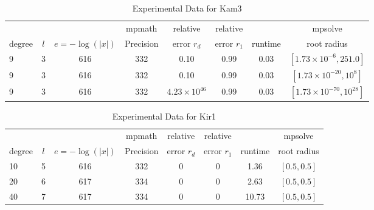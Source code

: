 \documentclass[sigconf]{acmart}
\begin{document}
\begin{table}[t]
\caption{Experimental Data for Kam3}
\label{tab:kam3}
\vskip -0.15in
\begin{center}
\begin{small}
\begin{sc}
\begin{tabular}{lccccccc}
\toprule
&  &  & mpmath & relative  & relative &  & mpsolve \\
degree  & $l$& $e=-\log(|x|)$& Precision &error $r_d$       & error $r_1$ &runtime& root radius\\
\midrule
   9 & 3 & 616 & 332 & 0.10 & 0.99 & 0.03 & $[1.73 \times 10^{-6},251.0]$ \\
   9 & 3 & 616 & 332 & 0.10 & 0.99 & 0.03 & $[1.73 \times 10^{-20},10^8]$\\ %
   9 & 3 & 616 & 332 & $4.23 \times 10^{46}$ & 0.99 & 0.03 & $[1.73 \times 10^{-70},10^{28}]$\\
\bottomrule
\end{tabular}
\end{sc}
\end{small}
\end{center}
\vskip 0.05in
\end{table}

\begin{table}[t]
\caption{Experimental Data for Kir1}
\label{tab:kir1}
\vskip -0.15in
\begin{center}
\begin{small}
\begin{sc}
\begin{tabular}{lccccccc}
\toprule
&  &  & mpmath & relative  & relative &  & mpsolve \\
degree  & $l$& $e=-\log(|x|)$& Precision &error $r_d$       & error $r_1$ &runtime& root radius\\
\midrule
   10 & 5 & 616 & 332 & 0 & 0 & 1.36 & $[0.5, 0.5]$\\
   20 & 6 & 617 & 334 & 0 & 0 & 2.63 & $[0.5, 0.5]$\\
   40 & 7 & 617 & 334 & 0 & 0 & 10.73 & $[0.5, 0.5]$\\
\bottomrule
\end{tabular}
\end{sc}
\end{small}
\end{center}
\vskip 0.05in
\end{table}
\end{document}
